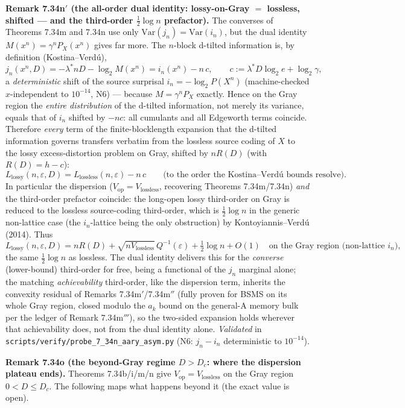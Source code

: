 \documentclass[
]{article}
\begin{document}
\textbf{Remark 7.34n$'$ (the all-order dual identity: lossy-on-Gray $=$ lossless,
shifted --- and the third-order $\tfrac12\log n$ prefactor).} The converses of
Theorems 7.34m and 7.34n use only $\mathrm{Var}(j_n)=\mathrm{Var}(i_n)$, but the
dual identity $M(x^n)=\gamma^n P_X(x^n)$ gives far more. The $n$-block d-tilted
information is, by definition (Kostina--Verd\'u),
\[
  j_n(x^n,D)=-\lambda^* nD-\log_2 M(x^n)=i_n(x^n)-n\,c,\qquad
  c:=\lambda^*D\log_2 e+\log_2\gamma,
\]
a \emph{deterministic} shift of the source surprisal $i_n=-\log_2 P(X^n)$
(machine-checked $x$-independent to $10^{-14}$, N6) --- because $M=\gamma^n P_X$
exactly. Hence on the Gray region the \emph{entire distribution} of the d-tilted
information, not merely its variance, equals that of $i_n$ shifted by $-nc$: all
cumulants and all Edgeworth terms coincide. Therefore \emph{every} term of the
finite-blocklength expansion that the d-tilted information governs transfers
verbatim from the lossless source coding of $X$ to the lossy excess-distortion
problem on Gray, shifted by $nR(D)$ (with $R(D)=h-c$):
\[
  L_{\mathrm{lossy}}(n,\varepsilon,D)=L_{\mathrm{lossless}}(n,\varepsilon)-n\,c
  \qquad\text{(to the order the Kostina--Verd\'u bounds resolve).}
\]
In particular the dispersion ($V_{\mathrm{op}}=V_{\mathrm{lossless}}$, recovering
Theorems 7.34m/7.34n) \emph{and} the third-order prefactor coincide: the
long-open lossy third-order on Gray is reduced to the lossless source-coding
third-order, which is $\tfrac12\log n$ in the generic non-lattice case (the
$i_n$-lattice being the only obstruction) by Kontoyiannis--Verd\'u (2014). Thus
\[
  L_{\mathrm{lossy}}(n,\varepsilon,D)=nR(D)+\sqrt{nV_{\mathrm{lossless}}}\,
  Q^{-1}(\varepsilon)+\tfrac12\log n+O(1)\quad\text{on the Gray region (non-lattice $i_n$),}
\]
the same $\tfrac12\log n$ as lossless. The dual identity delivers this for the
\emph{converse} (lower-bound) third-order for free, being a functional of the
$j_n$ marginal alone; the matching \emph{achievability} third-order, like the
dispersion term, inherits the convexity residual of Remarks 7.34m$'$/7.34m$''$
(fully proven for BSMS on its whole Gray region, closed modulo the $a_k$ bound on
the general-A memory bulk per the ledger of Remark 7.34m$'''$), so the two-sided
expansion holds wherever that achievability does, not from the dual identity
alone. \emph{Validated} in
\texttt{scripts/verify/probe\_7\_34n\_aary\_asym.py} (N6: $j_n-i_n$ deterministic
to $10^{-14}$).

\textbf{Remark 7.34o (the beyond-Gray regime $D>D_c$: where the dispersion
plateau ends).} Theorems 7.34b/i/m/n give $V_{\mathrm{op}}=V_{\mathrm{lossless}}$
on the Gray region $0<D\le D_c$. The following maps what happens beyond it (the
exact value is open).
\end{document}
